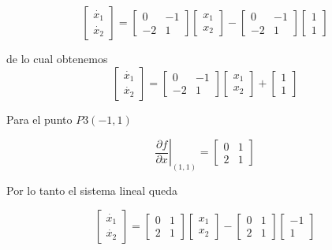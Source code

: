 \documentclass[12pt]{book}
\theoremstyle{definition}
\theoremstyle{remark}
\theoremstyle{plain}
\begin{document}
\begin{equation*}
 \begin{bmatrix}
\dot{x_1}\\
\dot{x_2}
\end{bmatrix}=
\begin{bmatrix}
0 & -1\\
-2 & 1
\end{bmatrix}
 \begin{bmatrix}
x_1\\
x_2
\end{bmatrix}
-
\begin{bmatrix}
0 & -1\\
-2 & 1
\end{bmatrix}
 \begin{bmatrix}
1\\
1
\end{bmatrix}
\end{equation*}

de lo cual obtenemos
\begin{equation*}
 \begin{bmatrix}
\dot{x_1}\\
\dot{x_2}
\end{bmatrix}=
\begin{bmatrix}
0 & -1\\
-2 & 1
\end{bmatrix}
 \begin{bmatrix}
x_1\\
x_2
\end{bmatrix}
+
 \begin{bmatrix}
1\\
1
\end{bmatrix}
\end{equation*}

Para el punto $P3(-1,1)$ 

\begin{equation}
\label{equ239}
 \left .  \frac{\partial f}{\partial x} \right |_{(1,1)} =
\begin{bmatrix}
0 & 1\\
2 & 1
\end{bmatrix}
\end{equation}

Por lo tanto el sistema lineal queda

\begin{equation*}
 \begin{bmatrix}
\dot{x_1}\\
\dot{x_2}
\end{bmatrix}=
\begin{bmatrix}
0 & 1\\
2 & 1
\end{bmatrix}
 \begin{bmatrix}
x_1\\
x_2
\end{bmatrix}
-
\begin{bmatrix}
0 & 1\\
2 & 1
\end{bmatrix}
 \begin{bmatrix}
-1\\
1
\end{bmatrix}
\end{equation*}
\end{document}

